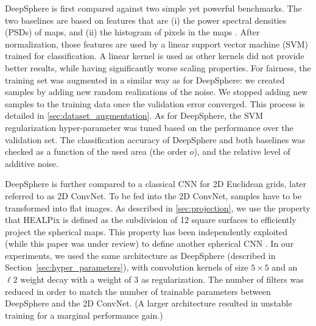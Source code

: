 \documentclass[final,twocolumn,3p,times,sort&compress]{elsarticle}
\newcommand{\secref}[1]{Section~\ref{sec:#1}}
\newcommand{\1}{\b{1}}              %
\newcommand{\0}{\b{0}}              %
\begin{document}
DeepSphere is first compared against two simple yet powerful benchmarks.
The two baselines are based on features that are (i) the power spectral densities (PSDs) of maps, and (ii) the histogram of pixels in the maps \citep{patton2017cosmologicalconstraints}.
After normalization, those features are used by a linear support vector machine (SVM) trained for classification.
A linear kernel is used as other kernels did not provide better results, while having significantly worse scaling properties.
For fairness, the training set was augmented in a similar way as for DeepSphere: we created samples by adding new random realizations of the noise. We stopped adding new samples to the training data once the validation error converged. This process is detailed in \ref{sec:dataset_augmentation}.
As for DeepSphere, the SVM regularization hyper-parameter was tuned based on the performance over the validation set.
The classification accuracy of DeepSphere and both baselines was checked as a function of the used area (the order $o$), and the relative level of additive noise.

DeepSphere is further compared to a classical CNN for 2D Euclidean grids, later referred to as 2D ConvNet.
To be fed into the 2D ConvNet, samples have to be transformed into flat images.
As described in \ref{sec:projection}, we use the property that HEALPix is defined as the subdivision of 12 square surfaces to efficiently project the spherical maps.
This property has been independently exploited (while this paper was under review) to define another spherical CNN \cite{krachmalnicoff2019convolutional}.
In our experiments, we used the same architecture as DeepSphere (described in \secref{hyper_parameters}), with convolution kernels of size $5 \times 5$ and an $\ell2$ weight decay with a weight of 3 as regularization.
The number of filters was reduced in order to match the number of trainable parameters between DeepSphere and the 2D ConvNet.
(A larger architecture resulted in unstable training for a marginal performance gain.)
\end{document}
